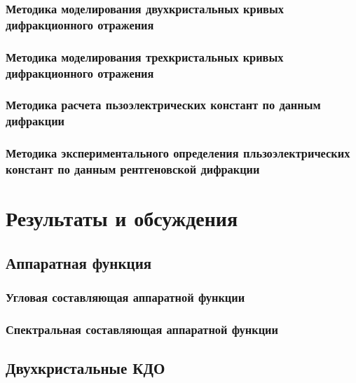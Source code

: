 \documentclass[pdftex,a4paper,14pt,english,russian]{extarticle}
\numberwithin{equation}{subsection}
\newcounter{subsubsubsection}[subsubsection]
\begin{document}
    \subsubsection{Методика моделирования двухкристальных кривых дифракционного отражения}
      
      
    \subsubsection{Методика моделирования трехкристальных кривых дифракционного отражения}
        
        
    \subsubsection{Методика расчета пьзоэлектрических констант по данным дифракции}
      
      \subsubsection{Методика экспериментального определения
      пльзоэлектрических констант по данным рентгеновской дифракции}
            
            


\newpage
\section{Результаты и обсуждения}
  \subsection{Аппаратная функция}
  \subsubsection{Угловая составляющая аппаратной функции}
    
  \subsubsection{Спектральная составляющая аппаратной функции}
      
  \subsection{Двухкристальные КДО}
\end{document}
